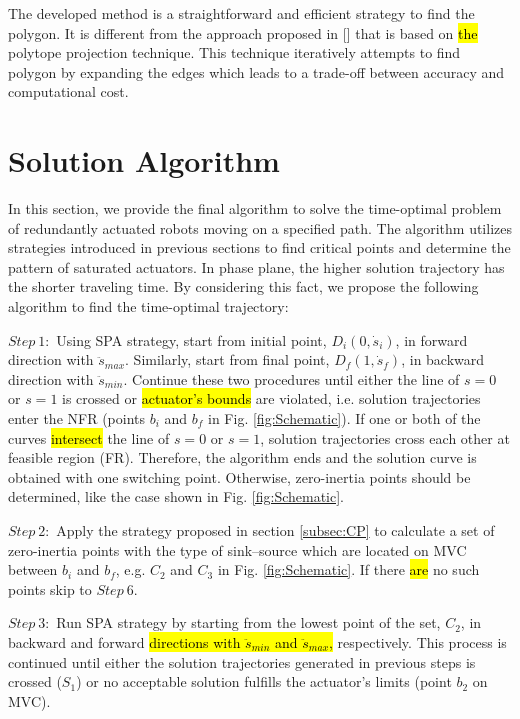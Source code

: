 \documentclass{rob}%
\begin{document}
The developed method is a straightforward and efficient strategy to find the polygon.
It is different from the approach proposed in [] that is based on \hl{the} polytope projection technique. This technique iteratively attempts to find polygon by expanding the edges which leads to a trade-off between accuracy and computational cost.

\section{Solution Algorithm}
\label{sec:SA}

In this section, we provide the final algorithm to solve the time-optimal problem of redundantly actuated robots moving on a specified path. The algorithm utilizes strategies introduced in previous sections to find critical points and determine the pattern of saturated actuators.
In phase plane, the higher solution trajectory has the shorter traveling time. By considering this fact, we propose the following algorithm to find the time-optimal trajectory:

$ Step \ 1: $
Using SPA strategy, start from initial point, $ D_i(0,\dot s_i) $, in forward direction with $ \ddot s_{max} $.
Similarly, start from final point, $ D_f(1,\dot s_f) $, in backward direction with $ \ddot s_{min} $. Continue these two procedures until either the line of $ s = 0 $ or $ s = 1 $ is crossed or \hl{actuator's bounds} are violated, i.e. solution trajectories enter the NFR (points $ b_i $ and $ b_f $ in Fig. \ref{fig:Schematic}).
If one or both of the curves \hl{intersect} the line of $ s = 0 $ or $ s = 1 $, solution trajectories cross each other at feasible region (FR). Therefore, the algorithm ends and the solution curve is obtained with one switching point. Otherwise, zero-inertia points should be determined, like the case shown in Fig. \ref{fig:Schematic}.

$ Step \ 2: $
Apply the strategy proposed in section \ref{subsec:CP} to calculate a set of zero-inertia points with the type of sink--source which are located on MVC between $ b_i $ and $ b_f $, e.g. $ C_2 $ and $ C_3 $ in Fig. \ref{fig:Schematic}. If there \hl{are} no such points skip to $ Step \ 6 $.

$ Step \ 3: $
Run SPA strategy by starting from the lowest point of the set, $ C_2 $, in backward and forward \hl{directions with $ \ddot s_{min} $ and $ \ddot s_{max} $,} respectively. This process is continued until either the solution trajectories generated in previous steps is crossed ($ S_1 $) or no acceptable solution fulfills the actuator's limits (point $ b_2 $ on MVC). 
\end{document}
